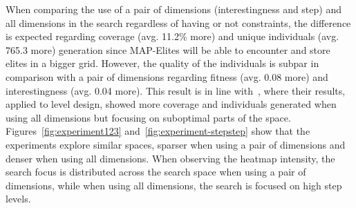 

When comparing the use of a pair of dimensions (interestingness and step) and all dimensions in the search regardless of having or not constraints, the difference is expected regarding coverage (avg. 11.2\% more) and unique individuals (avg. 765.3 more) generation since MAP-Elites will be able to encounter and store elites in a bigger grid. However, the quality of the individuals is subpar in comparison with a pair of dimensions regarding fitness (avg. 0.08 more) and interestingness (avg. 0.04 more). This result is in line with~\cite{p11alvarez_interactive_2020}, where their results, applied to level design, showed more coverage and individuals generated when using all dimensions but focusing on suboptimal parts of the space. Figures~\ref{fig:experiment123} and~\ref{fig:experiment-stepstep} show that the experiments explore similar spaces, sparser when using a pair of dimensions and denser when using all dimensions. When observing the heatmap intensity, the search focus is distributed across the search space when using a pair of dimensions, while when using all dimensions, the search is focused on high step levels.

